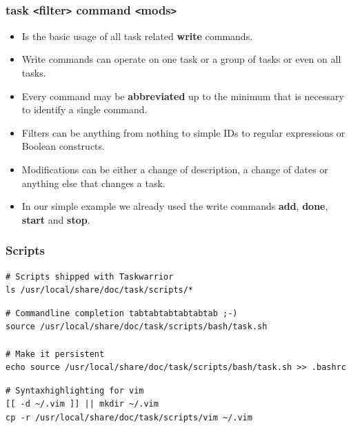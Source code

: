 \documentclass[t,handout]{beamer}
\begin{document}
\begin{frame}[fragile]\frametitle{task {\tt<}filter{\tt>} command {\tt<}mods{\tt>}}
    \begin{itemize}
        \item Is the basic usage of all task related \textbf{write} commands.
        \item Write commands can operate on one task or a group of tasks or even on all tasks.
        \item Every command may be \textbf{abbreviated} up to the minimum that is necessary to identify a single command.
        \item Filters can be anything from nothing to simple IDs to regular expressions or Boolean constructs.
        \item Modifications can be either a change of description, a change of dates or anything else that changes a task.
        \item In our simple example we already used the write commands \textbf{add}, \textbf{done}, \textbf{start} and \textbf{stop}.
    \end{itemize}
\end{frame}

\begin{frame}[fragile]\frametitle{Scripts}
    \vfill
    \begin{lstlisting}
# Scripts shipped with Taskwarrior
ls /usr/local/share/doc/task/scripts/*\end{lstlisting}

\begin{lstlisting}
# Commandline completion tabtabtabtabtabtab ;-)
source /usr/local/share/doc/task/scripts/bash/task.sh

# Make it persistent
echo source /usr/local/share/doc/task/scripts/bash/task.sh >> .bashrc\end{lstlisting}

\begin{lstlisting}
# Syntaxhighlighting for vim
[[ -d ~/.vim ]] || mkdir ~/.vim
cp -r /usr/local/share/doc/task/scripts/vim ~/.vim\end{lstlisting}
\end{frame}
\end{document}
